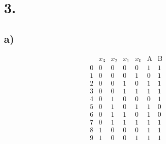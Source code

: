 \documentclass[a4paper]{scrartcl}
\begin{document}
	
\section{3.}
	\subsection{a)}
		\[\begin{array}{c||c|c|c|c||c|c}
			 &x_3 & x_2 & x_1 & x_0 & \text{A} & \text{B} \\ \hline
			0 & 0 & 0 & 0 & 0 & 1 & 1 \\
			1 & 0 & 0 & 0 & 1 & 0 & 1 \\
			2 & 0 & 0 & 1 & 0 & 1 & 1 \\
			3 & 0 & 0 & 1 & 1 & 1 & 1 \\
			4 & 0 & 1 & 0 & 0 & 0 & 1 \\
			5 & 0 & 1 & 0 & 1 & 1 & 0 \\
			6 & 0 & 1 & 1 & 0 & 1 & 0 \\
			7 & 0 & 1 & 1 & 1 & 1 & 1 \\
			8 & 1 & 0 & 0 & 0 & 1 & 1 \\
			9 & 1 & 0 & 0 & 1 & 1 & 1 \\
		\end{array}\] \\
		
\end{document}
